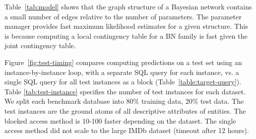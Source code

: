 \documentclass{IEEEtran}
\begin{document}
Table~\ref{tab:model} shows that the graph structure of a Bayesian network contains a small number of edges relative to the number of parameters. 
The parameter manager provides fast maximum likelihood estimates for a given structure. 
This is because computing a local contingency table for a BN family is fast given the joint contingency table.
%

\begin{table}[htbp]
\caption{Model Manager Evaluation.}
  \centering
  \label{tab:model}%
\end{table}%


Figure~\ref{fig:test-timing} compares computing predictions on a test set using an instance-by-instance loop, with a separate SQL query for each instance, vs. a single SQL query for all test instances as a block (Table~\ref{table:target-query}). Table \ref{tab:test-instance} specifies the number of  test instances for each dataset. We split each benchmark database into  80\% training data, 20\% test data. The test instances are the ground atoms of all descriptive attributes of entities.  The blocked access method is 10-100 faster depending on the dataset. The single access method did not scale to the large IMDb dataset (timeout after 12 hours).
\end{document}
